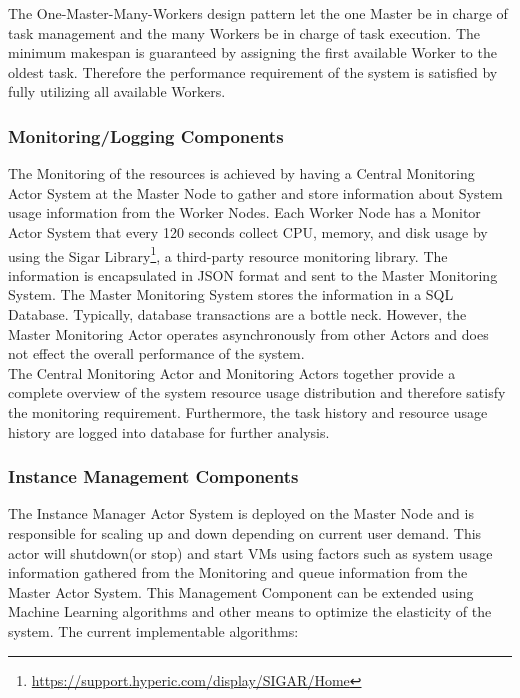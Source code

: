 \documentclass[conference]{IEEEtran}
\begin{document}
The One-Master-Many-Workers design pattern let the one Master be in charge of task management and the many Workers be in charge of task execution. The minimum makespan is guaranteed by assigning the first available Worker to the oldest task. Therefore the performance requirement of the system is satisfied by fully utilizing all available Workers. \\

\subsubsection{Monitoring/Logging Components}\label{sec:sysdesign_monitor}

The Monitoring of the resources is achieved by having a Central Monitoring Actor System at the Master Node to gather and store information about System usage information from the Worker Nodes. Each Worker Node has a Monitor Actor System that every 120 seconds collect CPU, memory, and disk usage by using the Sigar Library\footnote{\url{https://support.hyperic.com/display/SIGAR/Home}}, a third-party resource monitoring library. The information is encapsulated in JSON format and sent to the Master Monitoring System. The Master Monitoring System stores the information in a SQL Database. Typically, database transactions are a bottle neck. However, the Master Monitoring Actor operates asynchronously from other Actors and does not effect the overall performance of the system. \\

The Central Monitoring Actor and Monitoring Actors together provide a complete overview of the system resource usage distribution and therefore satisfy the monitoring requirement. Furthermore, the task history and resource usage history are logged into database for further analysis. \\

\subsubsection{Instance Management Components}\label{sec:sysdesign_instance}
The Instance Manager Actor System is deployed on the Master Node and is responsible for scaling up and down depending on current user demand. This actor will shutdown(or stop) and start VMs using factors such as system usage information gathered from the Monitoring and queue information from the Master Actor System. This Management Component can be extended using Machine Learning algorithms and other means to optimize the elasticity of the system. The current implementable algorithms:  \\
\end{document}
